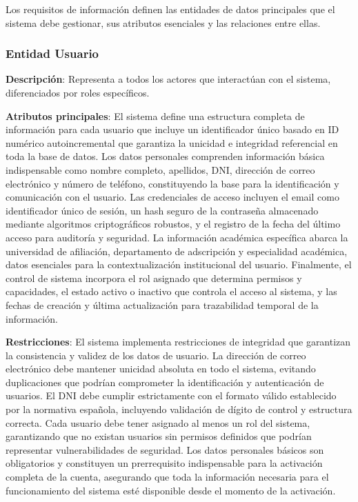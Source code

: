 \documentclass[12pt,a4paper,oneside]{report}
\begin{document}
Los requisitos de información definen las entidades de datos principales
que el sistema debe gestionar, sus atributos esenciales y las relaciones
entre ellas.

\subsubsection{Entidad Usuario}\label{entidad-usuario}

\textbf{Descripción}: Representa a todos los actores que interactúan con
el sistema, diferenciados por roles específicos.

\textbf{Atributos principales}: El sistema define una estructura completa de información para cada usuario que incluye un identificador único basado en ID numérico autoincremental que garantiza la unicidad e integridad referencial en toda la base de datos. Los datos personales comprenden información básica indispensable como nombre completo, apellidos, DNI, dirección de correo electrónico y número de teléfono, constituyendo la base para la identificación y comunicación con el usuario. Las credenciales de acceso incluyen el email como identificador único de sesión, un hash seguro de la contraseña almacenado mediante algoritmos criptográficos robustos, y el registro de la fecha del último acceso para auditoría y seguridad. La información académica específica abarca la universidad de afiliación, departamento de adscripción y especialidad académica, datos esenciales para la contextualización institucional del usuario. Finalmente, el control de sistema incorpora el rol asignado que determina permisos y capacidades, el estado activo o inactivo que controla el acceso al sistema, y las fechas de creación y última actualización para trazabilidad temporal de la información.

\textbf{Restricciones}: El sistema implementa restricciones de integridad que garantizan la consistencia y validez de los datos de usuario. La dirección de correo electrónico debe mantener unicidad absoluta en todo el sistema, evitando duplicaciones que podrían comprometer la identificación y autenticación de usuarios. El DNI debe cumplir estrictamente con el formato válido establecido por la normativa española, incluyendo validación de dígito de control y estructura correcta. Cada usuario debe tener asignado al menos un rol del sistema, garantizando que no existan usuarios sin permisos definidos que podrían representar vulnerabilidades de seguridad. Los datos personales básicos son obligatorios y constituyen un prerrequisito indispensable para la activación completa de la cuenta, asegurando que toda la información necesaria para el funcionamiento del sistema esté disponible desde el momento de la activación.
\end{document}
